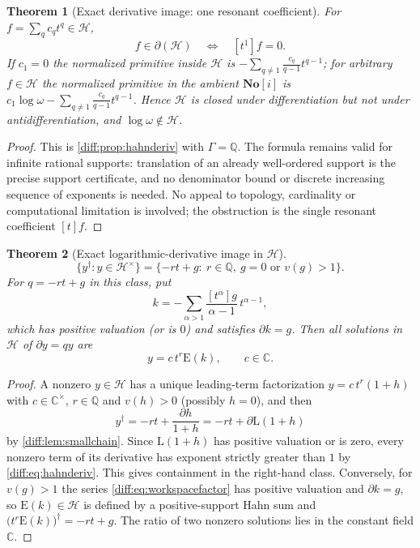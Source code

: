 \documentclass[11pt,letterpaper]{article}
\numberwithin{equation}{section}
\newtheorem{theorem}{Theorem}[section]
\theoremstyle{definition}
\theoremstyle{remark}
\newcommand{\SC}{\mathbf{No}[i]}
\newcommand{\C}{\mathbb C}
\newcommand{\Q}{\mathbb Q}
\newcommand{\der}{\partial}
\newcommand{\Emm}{\mathrm{E}}
\newcommand{\Lmm}{\mathrm{L}}
\newcommand{\Hring}{\mathscr H}
\begin{document}
\begin{theorem}[Exact derivative image: one resonant coefficient]
\label{diff:thm:Hahnintegral}
For $f=\sum_{q}c_{q}t^{q}\in\Hring$,
\begin{equation}\label{diff:eq:Hahnintegrability}
 f\in\der(\Hring)\quad\Longleftrightarrow\quad [t^{1}]f=0 .
\end{equation}
If $c_{1}=0$ the normalized primitive inside $\Hring$ is
$-\sum_{q\neq1}\frac{c_{q}}{q-1}t^{q-1}$; for arbitrary $f\in\Hring$ the
normalized primitive in the ambient $\SC$ is
$c_{1}\log\omega-\sum_{q\neq1}\frac{c_{q}}{q-1}t^{q-1}$. Hence $\Hring$ is
closed under differentiation but not under antidifferentiation, and
$\log\omega\notin\Hring$.
\end{theorem}
\begin{proof}
This is \cref{diff:prop:hahnderiv} with $\Gamma=\Q$. The formula remains valid
for infinite rational supports: translation of an already well-ordered support
is the precise support certificate, and no denominator bound or discrete
increasing sequence of exponents is needed. No appeal to topology,
cardinality or computational limitation is involved; the obstruction is the
single resonant coefficient $[t]f$.
\end{proof}

\begin{theorem}[Exact logarithmic-derivative image in $\Hring$]
\label{diff:thm:Hahnlogder}
\begin{equation}\label{diff:eq:Hahnlogderimage}
 \{y^{\dagger}:y\in\Hring^{\times}\}
 =\{-rt+g:\ r\in\Q,\ g=0\text{ or }v(g)>1\}.
\end{equation}
For $q=-rt+g$ in this class, put
\begin{equation}\label{diff:eq:workspacefactor}
 k=-\sum_{\alpha>1}\frac{[t^{\alpha}]g}{\alpha-1}\,t^{\alpha-1},
\end{equation}
which has positive valuation (or is $0$) and satisfies $\der k=g$. Then all
solutions in $\Hring$ of $\der y=qy$ are
\begin{equation}\label{diff:eq:Hahnall}
 y=c\,t^{r}\Emm(k),\qquad c\in\C .
\end{equation}
\end{theorem}
\begin{proof}
A nonzero $y\in\Hring$ has a unique leading-term factorization
$y=c\,t^{r}(1+h)$ with $c\in\C^{\times}$, $r\in\Q$ and $v(h)>0$ (possibly
$h=0$), and then
\[
 y^{\dagger}=-rt+\frac{\der h}{1+h}=-rt+\der\Lmm(1+h)
\]
by \cref{diff:lem:smallchain}. Since $\Lmm(1+h)$ has positive valuation or is
zero, every nonzero term of its derivative has exponent strictly greater than
$1$ by \cref{diff:eq:hahnderiv}. This gives containment in the right-hand
class. Conversely, for $v(g)>1$ the series \cref{diff:eq:workspacefactor} has
positive valuation and $\der k=g$, so $\Emm(k)\in\Hring$ is defined by a
positive-support Hahn sum and
$\bigl(t^{r}\Emm(k)\bigr)^{\dagger}=-rt+g$. The ratio of two nonzero solutions
lies in the constant field $\C$.
\end{proof}
\end{document}
